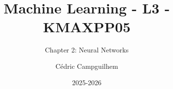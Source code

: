 \documentclass[10pt,handout]{beamer}  %
\title{Machine Learning - L3 - KMAXPP05}
\subtitle{Chapter 2: Neural Networks}
\author{Cédric Campguilhem}
\institute[]{
	Airbus Operations \\
	\href{mailto:cedric.campguilhem@airbus.com}{\texttt{cedric.campguilhem@airbus.com}}
}
\date{2025-2026}
\begin{document}
	
	\begin{frame}
		\titlepage
	\end{frame}
	
	
	
	
	
	
	
	
	
\end{document}

